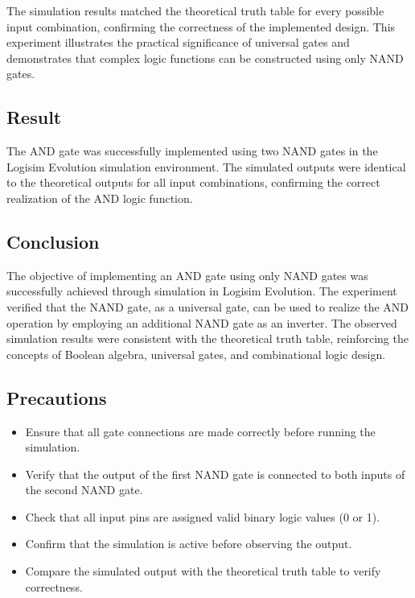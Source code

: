 \documentclass[12pt,a4paper]{article}
\begin{document}
The simulation results matched the theoretical truth table for every possible input combination, confirming the correctness of the implemented design. This experiment illustrates the practical significance of universal gates and demonstrates that complex logic functions can be constructed using only NAND gates.


\subsection{Result}

The AND gate was successfully implemented using two NAND gates in the Logisim Evolution simulation environment. The simulated outputs were identical to the theoretical outputs for all input combinations, confirming the correct realization of the AND logic function.


\subsection{Conclusion}

The objective of implementing an AND gate using only NAND gates was successfully achieved through simulation in Logisim Evolution. The experiment verified that the NAND gate, as a universal gate, can be used to realize the AND operation by employing an additional NAND gate as an inverter. The observed simulation results were consistent with the theoretical truth table, reinforcing the concepts of Boolean algebra, universal gates, and combinational logic design.


\subsection{Precautions}

\begin{itemize}
\item Ensure that all gate connections are made correctly before running the simulation.
\item Verify that the output of the first NAND gate is connected to both inputs of the second NAND gate.
\item Check that all input pins are assigned valid binary logic values (0 or 1).
\item Confirm that the simulation is active before observing the output.
\item Compare the simulated output with the theoretical truth table to verify correctness.
\end{itemize}
\end{document}
